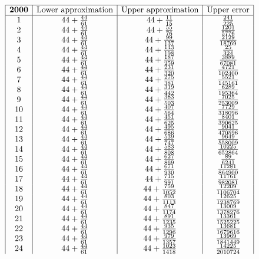 \documentclass{amsart}
\begin{document}
$$\begin{array}{|c|c|c|c|}
 \hline
 {\bf 2000}&\text{Lower approximation}&\text{Upper approximation}&\text{Upper error}\\
 \hline
1&44+\frac{44}{61}&44+\frac{11}{15}&\frac{241}{225}\\
2&44+\frac{44}{61}&44+\frac{55}{76}&\frac{1201}{5776}\\
3&44+\frac{44}{61}&44+\frac{99}{137}&\frac{2129}{18769}\\
4&44+\frac{44}{61}&44+\frac{143}{198}&\frac{25}{324}\\
5&44+\frac{44}{61}&44+\frac{187}{259}&\frac{3889}{67081}\\
6&44+\frac{44}{61}&44+\frac{231}{320}&\frac{4721}{102400}\\
7&44+\frac{44}{61}&44+\frac{275}{381}&\frac{5521}{145161}\\
8&44+\frac{44}{61}&44+\frac{319}{442}&\frac{6289}{195364}\\
9&44+\frac{44}{61}&44+\frac{363}{503}&\frac{7025}{253009}\\
10&44+\frac{44}{61}&44+\frac{407}{564}&\frac{7729}{318096}\\
11&44+\frac{44}{61}&44+\frac{451}{625}&\frac{8401}{390625}\\
12&44+\frac{44}{61}&44+\frac{495}{686}&\frac{9041}{470596}\\
13&44+\frac{44}{61}&44+\frac{539}{747}&\frac{9649}{558009}\\
14&44+\frac{44}{61}&44+\frac{583}{808}&\frac{10225}{652864}\\
15&44+\frac{44}{61}&44+\frac{627}{869}&\frac{89}{6241}\\
16&44+\frac{44}{61}&44+\frac{671}{930}&\frac{11281}{864900}\\
17&44+\frac{44}{61}&44+\frac{715}{991}&\frac{11761}{982081}\\
18&44+\frac{44}{61}&44+\frac{759}{1052}&\frac{12209}{1106704}\\
19&44+\frac{44}{61}&44+\frac{803}{1113}&\frac{12625}{1238769}\\
20&44+\frac{44}{61}&44+\frac{847}{1174}&\frac{13009}{1378276}\\
21&44+\frac{44}{61}&44+\frac{891}{1235}&\frac{13361}{1525225}\\
22&44+\frac{44}{61}&44+\frac{935}{1296}&\frac{13681}{1679616}\\
23&44+\frac{44}{61}&44+\frac{979}{1357}&\frac{13969}{1841449}\\
24&44+\frac{44}{61}&44+\frac{1023}{1418}&\frac{14225}{2010724}\\

\end{array}$$
\end{document}
